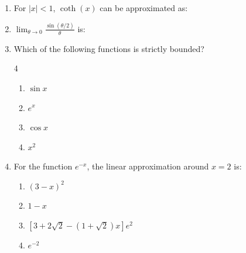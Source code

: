 \begin{enumerate}[label=\thesubsection.\arabic*,ref=\thesubsection.\theenumi]
\begin{enumerate}
\end{enumerate}


\item For $|x| < 1 $, $ \coth(x)$ can be approximated as: 
\hfill{}
\begin{enumerate}
\end{enumerate}

\item $ \lim_{\theta \to 0} \frac{\sin(\theta/2)}{\theta} $ is: 
\hfill{}
\begin{enumerate}
\end{enumerate}

\item Which of the following functions is strictly bounded? 
\hfill{}
\begin{multicols}{4}
\begin{enumerate}
    \item $ \sin x $
    \item $ e^x $
    \item $ \cos x $
    \item $ x^2 $
\end{enumerate}
\end{multicols}

\item For the function $ e^{-x} $, the linear approximation around $ x = 2 $ is:
\hfill{}
\begin{enumerate}
    \item $ (3 - x)^2 $
    \item $ 1 - x $
    \item $ [3 + 2\sqrt{2} - (1 + \sqrt{2})x]e^2 $
    \item $ e^{-2} $
\end{enumerate}


\end{enumerate}
